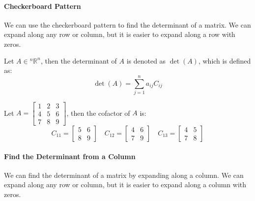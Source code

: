 \documentclass[11pt]{article}
\begin{document}
\paragraph{Checkerboard Pattern} We can use the checkerboard pattern to find the determinant of a matrix. We can expand along any row or column, but it is easier to expand along a row with zeros.
\begin{definition}[Determinant]
    Let $A \in  {^n\mathbb{R}^n}$, then the determinant of $A$ is denoted as $\det(A)$, which is defined as:
    \begin{equation}
        \det(A) = \sum_{j=1}^{n} a_{ij}C_{ij}
    \end{equation}
\end{definition}
\begin{example}
    Let $A = \begin{bmatrix} 1 & 2 & 3 \\ 4 & 5 & 6 \\ 7 & 8 & 9 \end{bmatrix}$, then the cofactor of $A$ is:
    $$ C_{11} = \begin{bmatrix} 5 & 6 \\ 8 & 9 \end{bmatrix} \quad C_{12} = \begin{bmatrix} 4 & 6 \\ 7 & 9 \end{bmatrix} \quad C_{13} = \begin{bmatrix} 4 & 5 \\ 7 & 8 \end{bmatrix} $$
\end{example}
\paragraph{Find the Determinant from a Column} We can find the determinant of a matrix by expanding along a column. We can expand along any row or column, but it is easier to expand along a column with zeros.
\end{document}
